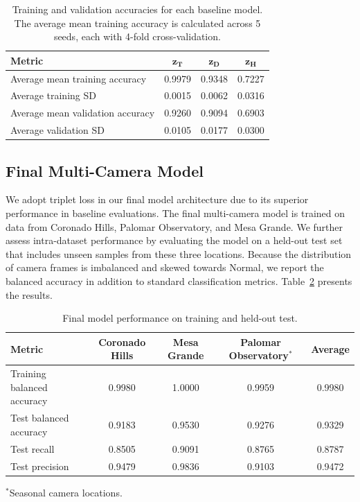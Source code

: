 \documentclass{article}
\begin{document}
\begin{table}[H]
\centering

\caption{Training and validation accuracies for each baseline model. The average mean training accuracy is calculated across 5 seeds, each with 4-fold cross-validation.}
\label{tab:train_val_accs}

\begin{tabular}{lccc}
\toprule
\textbf{Metric} & $\mathbf{z_T}$ & $\mathbf{z_D}$ & $\mathbf{z_H}$ \\
\midrule

Average mean training accuracy & 0.9979 & 0.9348 & 0.7227 \\
Average training SD & 0.0015 & 0.0062 & 0.0316 \\
Average mean validation accuracy & 0.9260 & 0.9094 & 0.6903 \\
Average validation SD & 0.0105 & 0.0177 & 0.0300 \\

\bottomrule
\end{tabular}

\end{table}

\subsection{Final Multi-Camera Model}

We adopt triplet loss in our final model architecture due to its superior performance in baseline evaluations. The final multi-camera model is trained on data from Coronado Hills, Palomar Observatory, and Mesa Grande. We further assess intra-dataset performance by evaluating the model on a held-out test set that includes unseen samples from these three locations. Because the distribution of camera frames is imbalanced and skewed towards Normal, we report the balanced accuracy in addition to standard classification metrics. Table~\ref{tab:train_test_accs} presents the results. 
\begin{table}[H]
\centering

\caption{Final model performance on training and held-out test.}
\label{tab:train_test_accs}

\begin{tabular}{lcccc}
\toprule
\textbf{Metric} & Coronado Hills & Mesa Grande & Palomar Observatory$^{*}$  & Average  \\
\midrule

Training balanced accuracy & 0.9980 & 1.0000 & 0.9959 & 0.9980 \\
Test balanced accuracy    & 0.9183 & 0.9530 & 0.9276 & 0.9329 \\
Test recall       & 0.8505 & 0.9091 & 0.8765 & 0.8787 \\
Test precision    & 0.9479 & 0.9836 & 0.9103 & 0.9472 \\

\bottomrule
\end{tabular}

\vspace{4pt}
\footnotesize
$^{*}$Seasonal camera locations.

\end{table}
\end{document}
